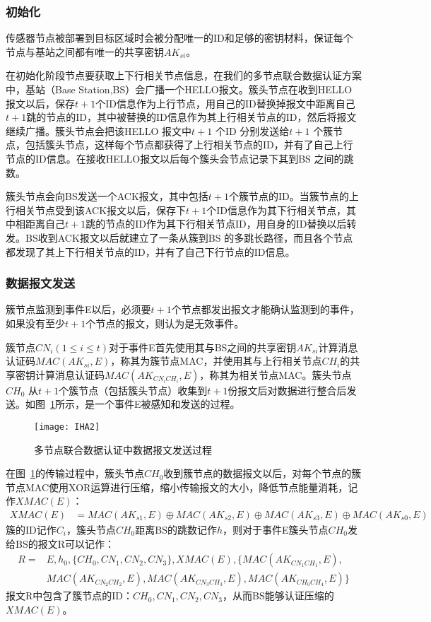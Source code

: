 \subsubsection{初始化}
传感器节点被部署到目标区域时会被分配唯一的ID和足够的密钥材料，保证每个节点与基站之间都有唯一的共享密钥$AK_{si}$。

在初始化阶段节点要获取上下行相关节点信息，在我们的多节点联合数据认证方案中，基站（Base Station,BS）会广播一个HELLO报文。簇头节点在收到HELLO 报文以后，保存$t+1$个ID信息作为上行节点，用自己的ID替换掉报文中距离自己$t+1$跳的节点的ID，其中被替换的ID信息作为其上行相关节点的ID，然后将报文继续广播。簇头节点会把该HELLO 报文中$t+1$ 个ID 分别发送给$t+1$ 个簇节点，包括簇头节点，这样每个节点都获得了上行相关节点的ID，并有了自己上行节点的ID信息。在接收HELLO报文以后每个簇头会节点记录下其到BS 之间的跳数。

簇头节点会向BS发送一个ACK报文，其中包括$t+1$个簇节点的ID。当簇节点的上行相关节点受到该ACK报文以后，保存下$t+1$个ID信息作为其下行相关节点，其中相距离自己$t+1$跳的节点的ID作为其下行相关节点ID，用自身的ID替换以后转发。BS收到ACK报文以后就建立了一条从簇到BS 的多跳长路径，而且各个节点都发现了其上下行相关节点的ID，并有了自己下行节点的ID信息。
\subsubsection{数据报文发送}
簇节点监测到事件E以后，必须要$t+1$个节点都发出报文才能确认监测到的事件，如果没有至少$t+1$个节点的报文，则认为是无效事件。

簇节点$CN_i(1\leq i\leq t)$对于事件E首先使用其与BS之间的共享密钥$AK_{si}$计算消息认证码$MAC(AK_{si},E)$，称其为簇节点MAC，并使用其与上行相关节点$CH_i$的共享密钥计算消息认证码$MAC(AK_{CN_i CH_i},E)$，称其为相关节点MAC。簇头节点$CH_0$ 从$t+1$个簇节点（包括簇头节点）收集到$t+1$份报文后对数据进行整合后发送。如图~\ref{fig:IHA2}所示，是一个事件E被感知和发送的过程。
\begin{figure}[htbp]
  \centering
  \texttt{[image: IHA2]}
  \caption{多节点联合数据认证中数据报文发送过程}
  \label{fig:IHA2}
\end{figure}

在图~\ref{fig:IHA2}的传输过程中，簇头节点$CH_0$收到簇节点的数据报文以后，对每个节点的簇节点MAC使用XOR运算进行压缩，缩小传输报文的大小，降低节点能量消耗，记作$XMAC(E)$：
\begin{equation}\label{XMAC}
\begin{split}
  XMAC(E)
  &=MAC(AK_{s1},E)\oplus MAC(AK_{s2},E)\oplus MAC(AK_{s3},E)\oplus MAC(AK_{s0},E)
\end{split}
\end{equation}
簇的ID记作$C_i$，簇头节点$CH_0$距离BS的跳数记作$h$，则对于事件E簇头节点$CH_0$发给BS的报文R可以记作：
\begin{equation}\label{report}
\begin{split}
  R=
  & E,h_0,\{CH_0,CN_1,CN_2,CN_3\},XMAC(E),\{MAC(AK_{CN_1 CH_1},E),\\
  & MAC(AK_{CN_2 CH_2},E),MAC(AK_{CN_3 CH_3},E),MAC(AK_{CH_0 CH_4},E)\}
\end{split}
\end{equation}
报文R中包含了簇节点的ID：$CH_0,CN_1,CN_2,CN_3$，从而BS能够认证压缩的$XMAC(E)$。

